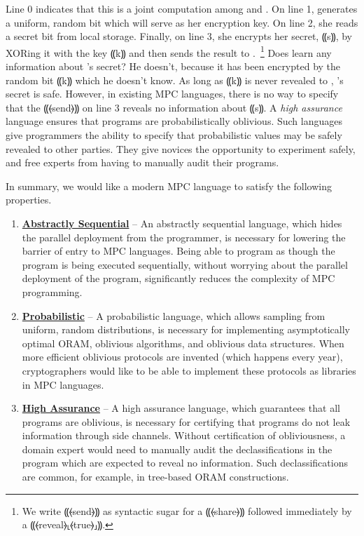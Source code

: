 Line 0 indicates that this is a joint computation among \alice and \bob. On line 1, \alice generates a uniform, random bit which will serve
as her encryption key. On line 2, she reads a secret bit from local storage. Finally, on line 3, she encrypts her secret, ⸨s⸩, by XORing it
with the key ⸨k⸩ and then sends the result to \bob.~\footnote{We write ⸨⦑send⦒⸩ as syntactic sugar for a ⸨⦑share⦒⸩ followed immediately by
a ⸨⦑reveal⦒⸤⦑true⦒⸥⸩.} Does \bob learn any information about \alice's secret? He doesn't, because it has been encrypted
by the random bit ⸨k⸩ which he doesn't know. As long as ⸨k⸩ is never revealed to \bob, \alice's secret is safe.
However, in existing MPC languages, there is no way to specify that the ⸨⦑send⦒⸩ on line 3 reveals no information about ⸨s⸩.
A \emph{high assurance} language ensures that programs are probabilistically oblivious. Such languages give programmers the ability to specify
that probabilistic values may be safely revealed to other parties. They give novices the opportunity to experiment safely, and free experts from having to
manually audit their programs.

In summary, we would like a modern MPC language to satisfy the following properties.

\begin{enumerate}
\item \label{itm:sequential} \textbf{\underline{Abstractly Sequential}} -- An abstractly sequential language, which hides the parallel deployment from the
  programmer, is necessary for lowering the barrier of entry to MPC languages. Being able to program as though the program is being executed sequentially,
  without worrying about the parallel deployment of the program, significantly reduces the complexity of MPC programming.
\item \label{itm:probabilistic} \textbf{\underline{Probabilistic}} -- A probabilistic language, which allows sampling from uniform, random distributions,
  is necessary for implementing asymptotically optimal ORAM, oblivious algorithms, and oblivious data structures. When more efficient oblivious protocols are
  invented (which happens every year), cryptographers would like to be able to implement these protocols as libraries in MPC languages.
\item \label{itm:assurance} \textbf{\underline{High Assurance}} -- A high assurance language, which guarantees that all programs are oblivious, is necessary
  for certifying that programs do not leak information through side channels. Without certification of obliviousness, a domain expert
  would need to manually audit the declassifications in the program which are expected to reveal no information. Such declassifications
  are common, for example, in tree-based ORAM constructions.
\end{enumerate}

